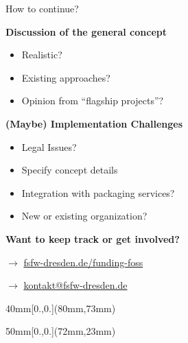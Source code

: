 \documentclass[t]{beamer}
\newcommand{\cst}[1]{{\usebeamercolor[fg]{structure}#1}}
\begin{document}
\begin{frame}[label=zf1]{\cst{How to continue?}}

\textbf{Discussion of the general concept}
\begin{itemize}
 \item Realistic?
 \item Existing approaches?
 \item Opinion from ``flagship projects''?
\end{itemize}


\pause
\vspace{6mm}

\textbf{(Maybe) Implementation Challenges}
\begin{itemize}
 \item Legal Issues?
 \item Specify concept details
 \item Integration with packaging services?
 \item New or existing organization?
\end{itemize}

\bigskip
\pause

\textbf{Want to keep track or get involved?}
\medskip

$\rightarrow$ \href{https://fsfw-dresden.de/funding-foss}{fsfw-dresden.de/funding-foss}

$\rightarrow$ \href{mailto:kontakt@fsfw-dresden.de}{kontakt@fsfw-dresden.de}


\begin{textblock*}{40mm}[0.,0.](80mm,73mm)
\end{textblock*}


\begin{textblock*}{50mm}[0.,0.](72mm,23mm)
\end{textblock*}
\end{frame}
\end{document}
